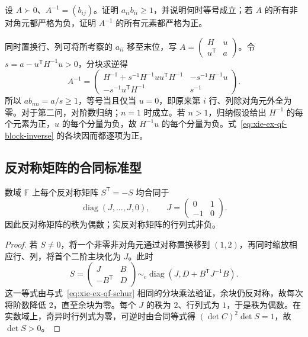 \begin{example}
设 $A\succ0$、$A^{-1}=(b_{ij})$。证明 $a_{ii}b_{ii}\ge1$，并说明何时等号成立；若 $A$ 的所有非对角元都严格为负，证明 $A^{-1}$ 的所有元素都严格为正。
\end{example}
\begin{solve}
同时置换行、列可将所考察的 $a_{ii}$ 移至末位，写 $A=\begin{pmatrix}H&u\\u^{\mathsf T}&a\end{pmatrix}$。令 $s=a-u^{\mathsf T}H^{-1}u>0$，分块求逆得
\begin{equation}
 A^{-1}=\begin{pmatrix}
 H^{-1}+s^{-1}H^{-1}uu^{\mathsf T}H^{-1}&-s^{-1}H^{-1}u\\
 -s^{-1}u^{\mathsf T}H^{-1}&s^{-1}
 \end{pmatrix}.
 \label{eq:xie-ex-qf-block-inverse}
\end{equation}
所以 $ab_{nn}=a/s\ge1$，等号当且仅当 $u=0$，即原来第 $i$ 行、列除对角元外全为零。对于第二问，对阶数归纳；$n=1$ 时成立。若 $n>1$，归纳假设给出 $H^{-1}$ 的每个元素为正，$u$ 的每个分量为负，故 $H^{-1}u$ 的每个分量为负。式~\eqref{eq:xie-ex-qf-block-inverse} 的各块因而都逐项为正。
\end{solve}

\subsection{反对称矩阵的合同标准型}

\begin{theorem}
\label{thm:xie-ex-qf-skew-form}
数域 $\mathbb F$ 上每个反对称矩阵 $S^{\mathsf T}=-S$ 均合同于
\[
 \operatorname{diag}(J,\ldots,J,0),\qquad
 J=\begin{pmatrix}0&1\\-1&0\end{pmatrix}.
\]
因此反对称矩阵的秩为偶数；实反对称矩阵的行列式非负。
\end{theorem}
\begin{proof}
若 $S\ne0$，将一个非零非对角元通过对称置换移到 $(1,2)$，再同时缩放相应行、列，将首个二阶主块化为 $J$。此时
\[
 S=\begin{pmatrix}J&B\\-B^{\mathsf T}&D\end{pmatrix}
 \sim_{\mathrm c}\operatorname{diag}(J,D+B^{\mathsf T}J^{-1}B).
\]
这一等式由与式~\eqref{eq:xie-ex-qf-schur} 相同的分块乘法验证，余块仍反对称，故每次将阶数降低 $2$，直至余块为零。每个 $J$ 的秩为 $2$、行列式为 $1$，于是秩为偶数。在实数域上，奇异时行列式为零，可逆时由合同等式得 $(\det C)^2\det S=1$，故 $\det S>0$。
\end{proof}

